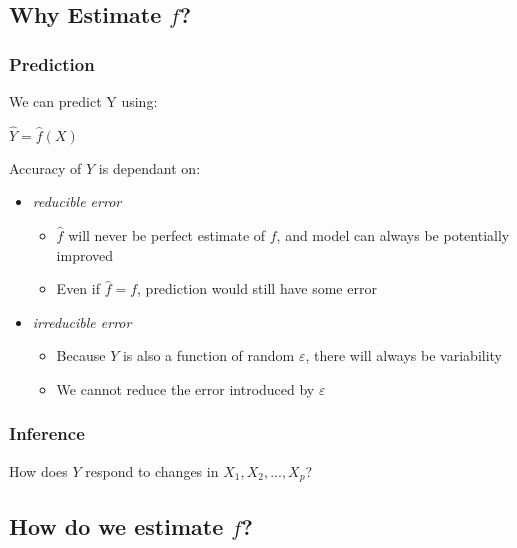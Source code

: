 \documentclass[]{book}
\providecommand{\tightlist}{%
  \setlength{\itemsep}{0pt}\setlength{\parskip}{0pt}}
\begin{document}
\hypertarget{why-estimate-f}{%
\subsection{\texorpdfstring{Why Estimate \emph{\(f\)}?}{Why Estimate f?}}\label{why-estimate-f}}

\hypertarget{prediction}{%
\subsubsection{Prediction}\label{prediction}}

We can predict Y using:

\(\hat{Y} = \hat{f}(X)\)

Accuracy of \(Y\) is dependant on:

\begin{itemize}
\tightlist
\item
  \emph{reducible error}

  \begin{itemize}
  \tightlist
  \item
    \(\hat{f}\) will never be perfect estimate of \(f\), and model can always be potentially improved
  \item
    Even if \(\hat{f} = f\), prediction would still have some error
  \end{itemize}
\item
  \emph{irreducible error}

  \begin{itemize}
  \tightlist
  \item
    Because \(Y\) is also a function of random \(ε\), there will always be variability
  \item
    We cannot reduce the error introduced by \(ε\)
  \end{itemize}
\end{itemize}

\hypertarget{inference}{%
\subsubsection{Inference}\label{inference}}

How does \(Y\) respond to changes in \(X_1, X_2, ..., X_p\)?

\hypertarget{how-do-we-estimate-f}{%
\subsection{\texorpdfstring{How do we estimate \emph{\(f\)}?}{How do we estimate f?}}\label{how-do-we-estimate-f}}
\end{document}
